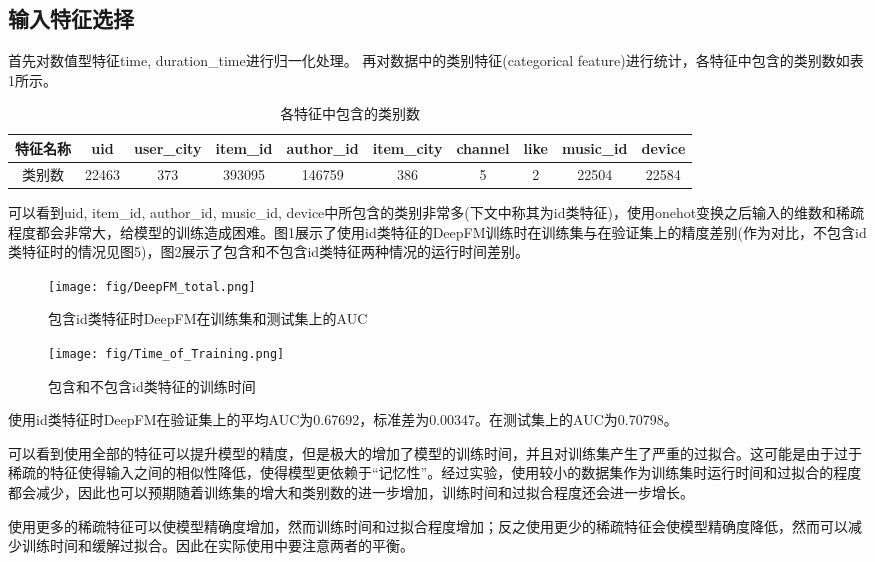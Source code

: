 \documentclass[]{article}
\begin{document}
\subsection{输入特征选择}
首先对数值型特征time, duration\_time进行归一化处理。
再对数据中的类别特征(categorical feature)进行统计，各特征中包含的类别数如表1所示。
~\\
\begin{table}[h]
	\centering
	\begin{tabular}{cccccccccc}
		\hline
		特征名称&uid&user\_city&item\_id&author\_id&item\_city&channel&like&music\_id&device\\
		\hline
		类别数&22463&373&393095&146759&386&5&2&22504&22584\\
		\hline
	\end{tabular}
	\caption{各特征中包含的类别数}
\end{table}

可以看到uid, item\_id, author\_id, music\_id, device中所包含的类别非常多(下文中称其为id类特征)，使用onehot变换之后输入的维数和稀疏程度都会非常大，给模型的训练造成困难。图1展示了使用id类特征的DeepFM训练时在训练集与在验证集上的精度差别(作为对比，不包含id类特征时的情况见图5)，图2展示了包含和不包含id类特征两种情况的运行时间差别。

\begin{figure}[htbp]
	\centering
	\texttt{[image: fig/DeepFM\_total.png]}
	\caption{包含id类特征时DeepFM在训练集和测试集上的AUC}
\end{figure}

\begin{figure}[htbp]
	\centering
	\texttt{[image: fig/Time\_of\_Training.png]}
	\caption{包含和不包含id类特征的训练时间}
\end{figure}

使用id类特征时DeepFM在验证集上的平均AUC为0.67692，标准差为0.00347。在测试集上的AUC为0.70798。

可以看到使用全部的特征可以提升模型的精度，但是极大的增加了模型的训练时间，并且对训练集产生了严重的过拟合。这可能是由于过于稀疏的特征使得输入之间的相似性降低，使得模型更依赖于“记忆性”。经过实验，使用较小的数据集作为训练集时运行时间和过拟合的程度都会减少，因此也可以预期随着训练集的增大和类别数的进一步增加，训练时间和过拟合程度还会进一步增长。

使用更多的稀疏特征可以使模型精确度增加，然而训练时间和过拟合程度增加；反之使用更少的稀疏特征会使模型精确度降低，然而可以减少训练时间和缓解过拟合。因此在实际使用中要注意两者的平衡。
\end{document}

